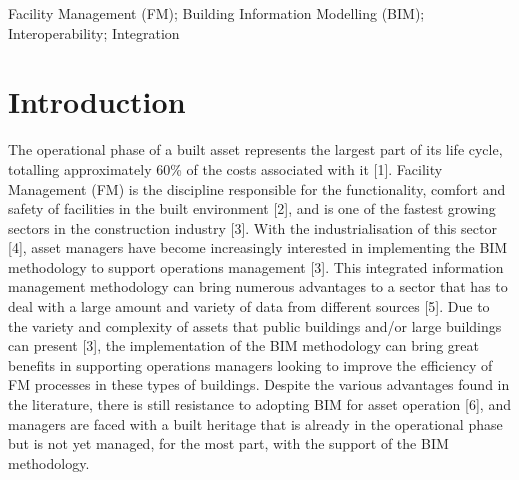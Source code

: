 \documentclass[a4paper, 10pt, twocolumn, twoside]{article}
\begin{document}
\begin{keywords}
Facility Management (FM); Building Information Modelling (BIM); Interoperability; Integration
\end{keywords}


\section{Introduction}
\label{sec:Introduction}

The operational phase of a built asset represents the largest part of its life cycle, totalling approximately 60\% of the costs associated with it [1]. Facility Management (FM) is the discipline responsible for the functionality, comfort and safety of facilities in the built environment [2], and is one of the fastest growing sectors in the construction industry [3]. With the industrialisation of this sector [4], asset managers have become increasingly interested in implementing the BIM methodology to support operations management [3]. This integrated information management methodology can bring numerous advantages to a sector that has to deal with a large amount and variety of data from different sources [5]. Due to the variety and complexity of assets that public buildings and/or large buildings can present [3], the implementation of the BIM methodology can bring great benefits in supporting operations managers looking to improve the efficiency of FM processes in these types of buildings. Despite the various advantages found in the literature, there is still resistance to adopting BIM for asset operation [6], and managers are faced with a built heritage that is already in the operational phase but is not yet managed, for the most part, with the support of the BIM methodology.
\end{document}
